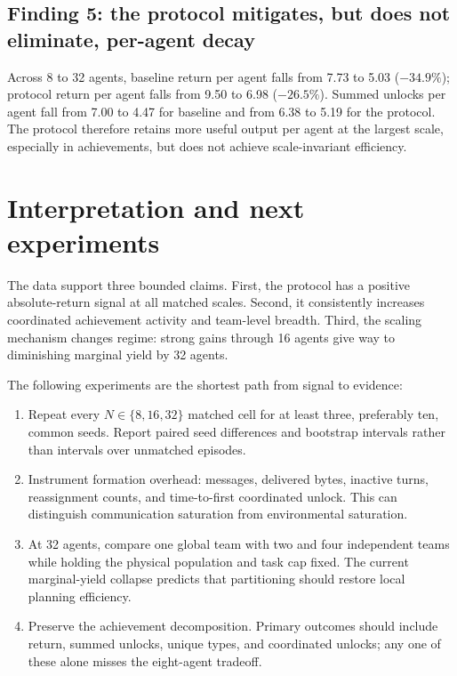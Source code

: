 \documentclass[10pt]{article}
\begin{document}
\subsection{Finding 5: the protocol mitigates, but does not eliminate,
per-agent decay}

Across 8 to 32 agents, baseline return per agent falls from 7.73 to 5.03
(\(-34.9\%\)); protocol return per agent falls from 9.50 to 6.98
(\(-26.5\%\)).  Summed unlocks per agent fall from 7.00 to 4.47 for baseline
and from 6.38 to 5.19 for the protocol.  The protocol therefore retains more
useful output per agent at the largest scale, especially in achievements, but
does not achieve scale-invariant efficiency.

\section{Interpretation and next experiments}

The data support three bounded claims.  First, the protocol has a positive
absolute-return signal at all matched scales.  Second, it consistently
increases coordinated achievement activity and team-level breadth.  Third,
the scaling mechanism changes regime: strong gains through 16 agents give way
to diminishing marginal yield by 32 agents.

The following experiments are the shortest path from signal to evidence:
\begin{enumerate}
  \item Repeat every \(N\in\{8,16,32\}\) matched cell for at least three,
  preferably ten, common seeds.  Report paired seed differences and bootstrap
  intervals rather than intervals over unmatched episodes.
  \item Instrument formation overhead: messages, delivered bytes, inactive
  turns, reassignment counts, and time-to-first coordinated unlock.  This can
  distinguish communication saturation from environmental saturation.
  \item At 32 agents, compare one global team with two and four independent
  teams while holding the physical population and task cap fixed.  The current
  marginal-yield collapse predicts that partitioning should restore local
  planning efficiency.
  \item Preserve the achievement decomposition.  Primary outcomes should
  include return, summed unlocks, unique types, and coordinated unlocks; any
  one of these alone misses the eight-agent tradeoff.
\end{enumerate}
\end{document}

